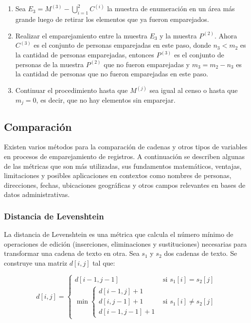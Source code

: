 \documentclass[
  12pt,
]{book}
\begin{document}
\begin{enumerate}
\item
  Sea \(E_3 = M^{(3)} - \bigcup_{i=1}^2C^{(i)}\) la muestra de enumeración en un área más grande luego de retirar los elementos que ya fueron emparejados.
\item
  Realizar el emparejamiento entre la muestra \(E_3\) y la muestra \(P^{(2)}\). Ahora \(C^{(3)}\) es el conjunto de personas emparejadas en este paso, donde \(n_3<m_2\) es la cantidad de personas emparejadas, entonces \(P^{(3)}\) es el conjunto de personas de la muestra \(P^{(2)}\) que no fueron emparejadas y \(m_3 = m_2 - n_3\) es la cantidad de personas que no fueron emparejadas en este paso.
\item
  Continuar el procedimiento hasta que \(M^{(j)}\) sea igual al censo o hasta que \(m_j=0\), es decir, que no hay elementos sin emparejar.
\end{enumerate}

\subsection{Comparación}\label{comparaciuxf3n}

Existen varios métodos para la comparación de cadenas y otros tipos de variables en procesos de emparejamiento de registros. A continuación se describen algunas de las métricas que son más utilizadas, sus fundamentos matemáticos, ventajas, limitaciones y posibles aplicaciones en contextos como nombres de personas, direcciones, fechas, ubicaciones geográficas y otros campos relevantes en bases de datos administrativas.

\subsubsection{Distancia de Levenshtein}\label{distancia-de-levenshtein}

La distancia de Levenshtein es una métrica que calcula el número mínimo de operaciones de edición (inserciones, eliminaciones y sustituciones) necesarias para transformar una cadena de texto en otra. Sea \(s_1\) y \(s_2\) dos cadenas de texto. Se construye una matriz \(d[i,j]\) tal que:

\[d[i, j] = 
\begin{cases}
d[i - 1, j - 1] & \text{si } s_1[i] = s_2[j] \\
\min \begin{cases}
d[i - 1, j] + 1 \\ 
d[i, j - 1] + 1 \\ 
d[i - 1, j - 1] + 1
\end{cases} & \text{si } s_1[i] \ne s_2[j]
\end{cases}
\]
\end{document}

